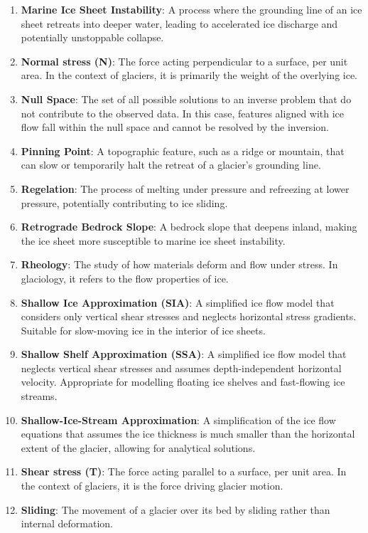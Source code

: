 \begin{enumerate}
\item \textbf{Marine Ice Sheet Instability}: A process where the grounding line of an ice sheet retreats into deeper water, leading to accelerated ice discharge and potentially unstoppable collapse.
\item \textbf{Normal stress (N)}: The force acting perpendicular to a surface, per unit area. In the context of glaciers, it is primarily the weight of the overlying ice.
\item \textbf{Null Space}: The set of all possible solutions to an inverse problem that do not contribute to the observed data. In this case, features aligned with ice flow fall within the null space and cannot be resolved by the inversion.
\item \textbf{Pinning Point}: A topographic feature, such as a ridge or mountain, that can slow or temporarily halt the retreat of a glacier's grounding line.
\item \textbf{Regelation}: The process of melting under pressure and refreezing at lower pressure, potentially contributing to ice sliding.
\item \textbf{Retrograde Bedrock Slope}: A bedrock slope that deepens inland, making the ice sheet more susceptible to marine ice sheet instability.
\item \textbf{Rheology}: The study of how materials deform and flow under stress. In glaciology, it refers to the flow properties of ice.
\item \textbf{Shallow Ice Approximation (SIA)}: A simplified ice flow model that considers only vertical shear stresses and neglects horizontal stress gradients. Suitable for slow-moving ice in the interior of ice sheets.
\item \textbf{Shallow Shelf Approximation (SSA)}: A simplified ice flow model that neglects vertical shear stresses and assumes depth-independent horizontal velocity. Appropriate for modelling floating ice shelves and fast-flowing ice streams.
\item \textbf{Shallow-Ice-Stream Approximation}: A simplification of the ice flow equations that assumes the ice thickness is much smaller than the horizontal extent of the glacier, allowing for analytical solutions.
\item \textbf{Shear stress (T)}: The force acting parallel to a surface, per unit area. In the context of glaciers, it is the force driving glacier motion.
\item \textbf{Sliding}: The movement of a glacier over its bed by sliding rather than internal deformation.

\end{enumerate}
